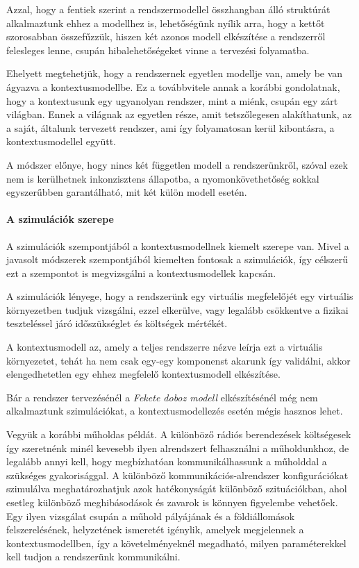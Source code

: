             Azzal, hogy a fentiek szerint a rendszermodellel összhangban álló struktúrát alkalmaztunk ehhez a modellhez is, lehetőségünk nyílik arra, hogy a kettőt szorosabban összefűzzük, hiszen két azonos modell elkészítése a rendszerről felesleges lenne, csupán hibalehetőségeket vinne a tervezési folyamatba.

            Ehelyett megtehetjük, hogy a rendszernek egyetlen modellje van, amely be van ágyazva a kontextusmodellbe. Ez a továbbvitele annak a korábbi gondolatnak, hogy a kontextusunk egy ugyanolyan rendszer, mint a miénk, csupán egy zárt világban. Ennek a világnak az egyetlen része, amit tetszőlegesen alakíthatunk, az a saját, általunk tervezett rendszer, ami így folyamatosan kerül kibontásra, a kontextusmodellel együtt.

            A módszer előnye, hogy nincs két független modell a rendszerünkről, szóval ezek nem is kerülhetnek inkonzisztens állapotba, a nyomonkövethetőség sokkal egyszerűbben garantálható, mit két külön modell esetén.

            \paragraph{A szimulációk szerepe}
            A szimulációk szempontjából a kontextusmodellnek kiemelt szerepe van. Mivel a javasolt módszerek szempontjából kiemelten fontosak a szimulációk, így célszerű ezt a szempontot is megvizsgálni a kontextusmodellek kapcsán.

            A szimulációk lényege, hogy a rendszerünk egy virtuális megfelelőjét egy virtuális környezetben tudjuk vizsgálni, ezzel elkerülve, vagy legalább csökkentve a fizikai teszteléssel járó időszükséglet és költségek mértékét.

            A kontextusmodell az, amely a teljes rendszerre nézve leírja ezt a virtuális környezetet, tehát ha nem csak egy-egy komponenst akarunk így validálni, akkor elengedhetetlen egy ehhez megfelelő kontextusmodell elkészítése.

            Bár a rendszer tervezésénél a \emph{Fekete doboz modell} elkészítésénél még nem alkalmaztunk szimulációkat, a kontextusmodellezés esetén mégis hasznos lehet.
            
            Vegyük a korábbi műholdas példát. A különböző rádiós berendezések költségesek így szeretnénk minél kevesebb ilyen alrendszert felhasználni a műholdunkhoz, de legalább annyi kell, hogy megbízhatóan kommunikálhassunk a műholddal a szükséges gyakorisággal.
            A különböző kommunikációs-alrendszer konfigurációkat szimulálva meghatározhatjuk azok hatékonyságát különböző szituációkban, ahol esetleg különböző meghibásodások és zavarok is könnyen figyelembe vehetőek.
            Egy ilyen vizsgálat csupán a műhold pályájának és a földiállomások felszerelésének, helyzetének ismeretét igénylik, amelyek megjelennek a kontextusmodellben, így a követelményeknél megadható, milyen paraméterekkel kell tudjon a rendszerünk kommunikálni.


